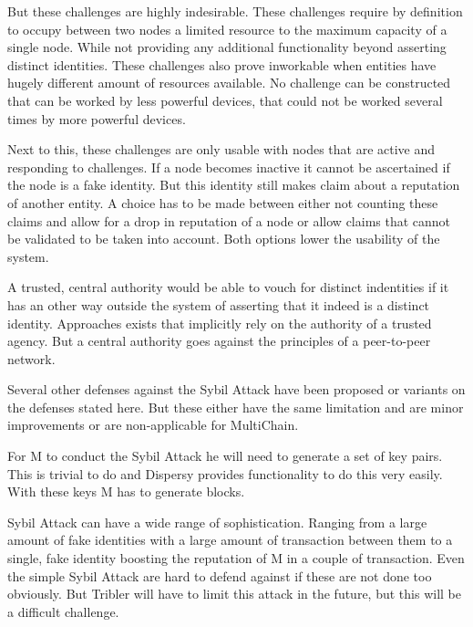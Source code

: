 But these challenges are highly indesirable.
These challenges require by definition to occupy between two nodes a limited resource to the maximum capacity of a single node.
While not providing any additional functionality beyond asserting distinct identities.
These challenges also prove inworkable when entities have hugely different amount of resources available.
No challenge can be constructed that can be worked by less powerful devices,
that could not be worked several times by more powerful devices.

Next to this, these challenges are only usable with nodes that are active and responding to challenges.
If a node becomes inactive it cannot be ascertained if the node is a fake identity.
But this identity still makes claim about a reputation of another entity.
A choice has to be made between either not counting these claims and allow for a drop in reputation of a node or
allow claims that cannot be validated to be taken into account.
Both options lower the usability of the system.

A trusted, central authority would be able to vouch for distinct indentities
if it has an other way outside the system of asserting that it indeed is a distinct identity.
Approaches exists that implicitly rely on the authority of a trusted agency.
But a central authority goes against the principles of a peer-to-peer network.

Several other defenses against the Sybil Attack have been proposed\cite{newsome-sybil}\cite{dinger-sybil}
or variants on the defenses stated here\cite{levine-sybilsurvey}.
But these either have the same limitation and are minor improvements or are non-applicable for MultiChain.

For M to conduct the Sybil Attack he will need to generate a set of key pairs.
This is trivial to do and Dispersy provides functionality to do this very easily.
With these keys M has to generate blocks.

Sybil Attack can have a wide range of sophistication.
Ranging from a large amount of fake identities with a large amount of transaction between them
to a single, fake identity boosting the reputation of M in a couple of transaction.
Even the simple Sybil Attack are hard to defend against if these are not done too obviously.
But Tribler will have to limit this attack in the future,
but this will be a difficult challenge.